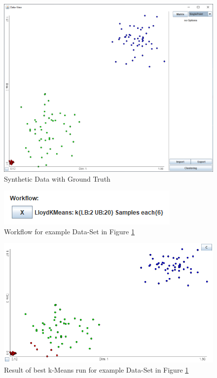 \documentclass[
	a4paper,
	english,
	twoside,
	openright,               
	11pt                            
	]{report}
\begin{document}
\begin{figure}[h]
	\centering
	\includegraphics[scale=.4]{better_base}
	\caption{Synthetic Data with Ground Truth}
	\label{fig:better_base}
\end{figure}
\begin{figure}[h]
	\centering
	\includegraphics[scale=.75]{better_base_wf}
	\caption{Workflow for example Data-Set in Figure \ref{fig:better_base}}
	\label{fig:better_base_wf}
\end{figure}
\begin{figure}[h]
	\centering
	\includegraphics[scale=.4]{better_base_best}
	\caption{Result of best k-Means run for example Data-Set in Figure \ref{fig:better_base}}
	\label{fig:better_base_best}
\end{figure}
\end{document}
